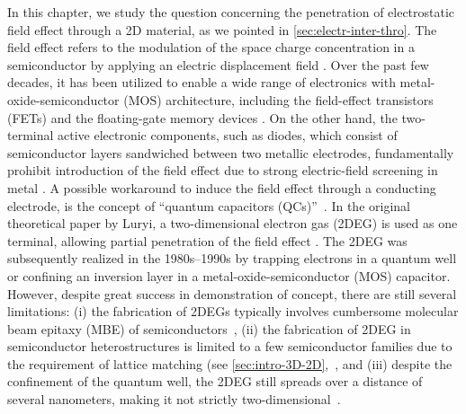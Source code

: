 In this chapter, we study the question concerning the penetration of
electrostatic field effect through a 2D material, as we pointed in
\autoref{sec:electr-inter-thro}.
%
The field effect refers to the modulation of the space charge
concentration in a semiconductor by applying an electric displacement
field \autocite{Sze_2006_Mosfets}.  Over the past few decades, it has been
utilized to enable a wide range of electronics with
metal-oxide-semiconductor (MOS) architecture, including the
field-effect transistors (FETs) and the floating-gate memory devices
\autocite{Sze_2006_Mosfets}.
%
On the other hand, the two-terminal active electronic components, such
as diodes, which consist of semiconductor layers sandwiched between
two metallic electrodes, fundamentally prohibit introduction of the
field effect due to strong electric-field screening in metal
\autocite{Ehrenreich_2001_solidstate_phys}.
%
A possible workaround to induce the field effect through a conducting
electrode, is the concept of ``quantum capacitors
(QCs)''~\autocite{Luryi_1988_Quantum}.  In the original theoretical paper
by Luryi, a two-dimensional electron gas (2DEG) is used as one
terminal, allowing partial penetration of the field effect
\autocite{Luryi_1988_Quantum}.
%
The 2DEG was subsequently realized in the 1980s--1990s by trapping
electrons in a quantum well \autocite{Davies_1997_book,Ihn_2009_book} or
confining an inversion layer in a metal-oxide-semiconductor (MOS)
capacitor\autocite{Sze_2006_Mosfets}.
%
However, despite great success in demonstration of concept, there are
still several limitations: (i) the fabrication of 2DEGs typically
involves cumbersome molecular beam epitaxy (MBE) of
semiconductors~\autocite{Chang_2012_MBE}, (ii) the fabrication of 2DEG in
semiconductor heterostructures is limited to a few semiconductor
families due to the requirement of lattice matching (see
\autoref{sec:intro-3D-2D},~\autocite{Stormer_1979_2DEG}, and (iii) despite
the confinement of the quantum well, the 2DEG still spreads over a
distance of several nano\-meters, making it not strictly
two-dimensional~\autocite{Ihn_2009_book}.
%

